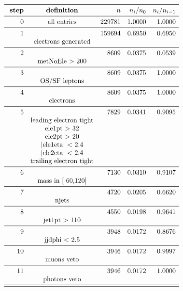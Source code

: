 \documentclass[11pt,a4paper]{article}
\begin{document}
\begin{table}
\caption{\emph{Entries after each selection step, normalised to 5.00 $fb^{-1}$; n is the number of entries after the i-th selection step; Note that cuts on second jet are applied only if a second jet exists with $p_t$ > 30\,GeV.}}
\[
\begin{array}{rcrrr}
\toprule
\ \textbf{step}& \textbf{definition}  & n  &  n_i/n_0 & n_i/n_{i-1}  \\ 
\midrule
 0  & \text{all entries} & 229781 & 1.0000 & 1.0000 \\
\midrule
 1  & & 159694 & 0.6950 & 0.6950 \\
& \text{electrons generated} & & & \\
\midrule
 2  & &   8609 & 0.0375 & 0.0539 \\
& \text{metNoEle > 200} & & & \\
\midrule
 3  & &   8609 & 0.0375 & 1.0000 \\
& \text{OS/SF leptons} & & & \\
\midrule
 4  & &   8609 & 0.0375 & 1.0000 \\
& \text{electrons} & & & \\
\midrule
 5  & &   7829 & 0.0341 & 0.9095 \\
& \text{leading electron tight} & & & \\
& \text{ele1pt >  32} & & & \\
& \text{ele2pt >  20} & & & \\
& \text{|ele1eta| < 2.4} & & & \\
& \text{|ele2eta| < 2.4} & & & \\
& \text{trailing electron tight} & & & \\
\midrule
 6  & &   7130 & 0.0310 & 0.9107 \\
& \text{mass in [ 60,120]} & & & \\
\midrule
 7  & &   4720 & 0.0205 & 0.6620 \\
& \text{njets} & & & \\
\midrule
 8  & &   4550 & 0.0198 & 0.9641 \\
& \text{jet1pt >  110} & & & \\
\midrule
 9  & &   3948 & 0.0172 & 0.8676 \\
& \text{jjdphi < 2.5} & & & \\
\midrule
 10  & &   3946 & 0.0172 & 0.9997 \\
& \text{muons veto} & & & \\
\midrule
 11  & &   3946 & 0.0172 & 1.0000 \\
& \text{photons veto} & & & \\
\midrule
\bottomrule
\end{array}
\]
\end{table}
\end{document}
